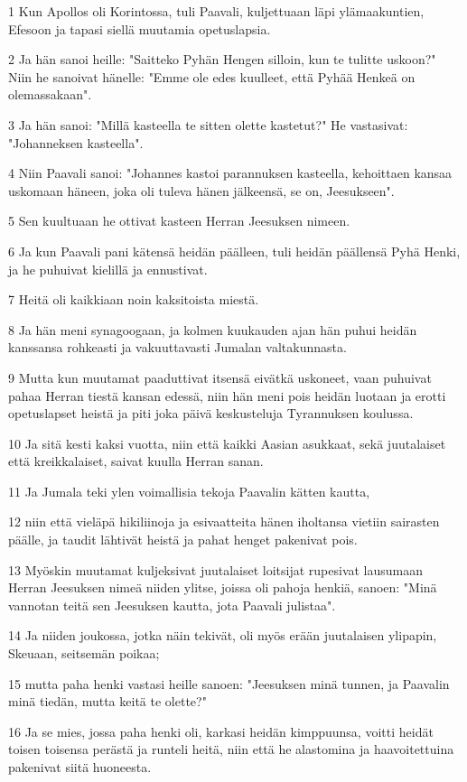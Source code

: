 \par 1 Kun Apollos oli Korintossa, tuli Paavali, kuljettuaan läpi ylämaakuntien, Efesoon ja tapasi siellä muutamia opetuslapsia.
\par 2 Ja hän sanoi heille: "Saitteko Pyhän Hengen silloin, kun te tulitte uskoon?" Niin he sanoivat hänelle: "Emme ole edes kuulleet, että Pyhää Henkeä on olemassakaan".
\par 3 Ja hän sanoi: "Millä kasteella te sitten olette kastetut?" He vastasivat: "Johanneksen kasteella".
\par 4 Niin Paavali sanoi: "Johannes kastoi parannuksen kasteella, kehoittaen kansaa uskomaan häneen, joka oli tuleva hänen jälkeensä, se on, Jeesukseen".
\par 5 Sen kuultuaan he ottivat kasteen Herran Jeesuksen nimeen.
\par 6 Ja kun Paavali pani kätensä heidän päälleen, tuli heidän päällensä Pyhä Henki, ja he puhuivat kielillä ja ennustivat.
\par 7 Heitä oli kaikkiaan noin kaksitoista miestä.
\par 8 Ja hän meni synagoogaan, ja kolmen kuukauden ajan hän puhui heidän kanssansa rohkeasti ja vakuuttavasti Jumalan valtakunnasta.
\par 9 Mutta kun muutamat paaduttivat itsensä eivätkä uskoneet, vaan puhuivat pahaa Herran tiestä kansan edessä, niin hän meni pois heidän luotaan ja erotti opetuslapset heistä ja piti joka päivä keskusteluja Tyrannuksen koulussa.
\par 10 Ja sitä kesti kaksi vuotta, niin että kaikki Aasian asukkaat, sekä juutalaiset että kreikkalaiset, saivat kuulla Herran sanan.
\par 11 Ja Jumala teki ylen voimallisia tekoja Paavalin kätten kautta,
\par 12 niin että vieläpä hikiliinoja ja esivaatteita hänen iholtansa vietiin sairasten päälle, ja taudit lähtivät heistä ja pahat henget pakenivat pois.
\par 13 Myöskin muutamat kuljeksivat juutalaiset loitsijat rupesivat lausumaan Herran Jeesuksen nimeä niiden ylitse, joissa oli pahoja henkiä, sanoen: "Minä vannotan teitä sen Jeesuksen kautta, jota Paavali julistaa".
\par 14 Ja niiden joukossa, jotka näin tekivät, oli myös erään juutalaisen ylipapin, Skeuaan, seitsemän poikaa;
\par 15 mutta paha henki vastasi heille sanoen: "Jeesuksen minä tunnen, ja Paavalin minä tiedän, mutta keitä te olette?"
\par 16 Ja se mies, jossa paha henki oli, karkasi heidän kimppuunsa, voitti heidät toisen toisensa perästä ja runteli heitä, niin että he alastomina ja haavoitettuina pakenivat siitä huoneesta.
